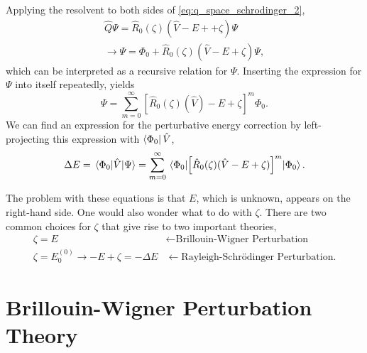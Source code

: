 Applying the resolvent to both sides of \autoref{eq:q_space_schrodinger_2},
\begin{equation}
    \begin{gathered}
    \hat{Q}\Psi = \hat{R}_0(\zeta)(\hat{V} - E + + \zeta)\Psi \\
    \to \Psi = \Phi_0 + \hat{R}_0(\zeta)(\hat{V} - E + \zeta)\Psi,
    \end{gathered}
\end{equation}
which can be interpreted as a recursive relation for $\Psi$. Inserting the 
expression for $\Psi$ into itself repeatedly, yields 
\begin{equation}
    \label{eq:perturbation_wavefunction}
    \Psi = \sum_{m=0}^\infty [\hat{R}_0(\zeta)(\hat{V}) - E + \zeta ]^m \Phi_0.
\end{equation}
We can find an expression for the perturbative energy correction by left-projecting 
this expression with $\bra{\Phi_0}\hat{V}$,
\begin{equation}
    \label{eq:perturbation_energy}
    \Delta E = \mel{\Phi_0}{\hat{V}}{\Psi} 
        = \sum_{m=0}^\infty \mel*{\Phi_0}
        {
            \left[\hat{R}_0(\zeta)(\hat{V} - E + \zeta)\right]^m
        }{\Phi_0}.
\end{equation}

The problem with these equations is that $E$, which is unknown, appears on the right-hand
side. One would also wonder what to do with $\zeta$. There are two common 
choices for $\zeta$ that give rise to two important theories,
\begin{align*}
    \zeta = E &\leftarrow \text{Brillouin-Wigner Perturbation} \\
    \zeta = E^{(0)}_0 \to -E + \zeta = -\Delta E 
        &\leftarrow \text{Rayleigh-Schrödinger Perturbation}.
\end{align*}

\section{Brillouin-Wigner Perturbation Theory}

